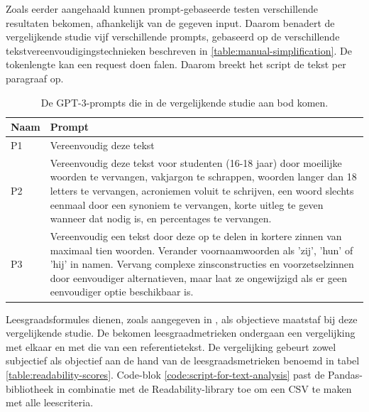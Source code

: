 
\medspace

Zoals eerder aangehaald kunnen prompt-gebaseerde testen verschillende resultaten bekomen, afhankelijk van de gegeven input. Daarom benadert de vergelijkende studie vijf verschillende prompts, gebaseerd op de verschillende tekstvereenvoudigingstechnieken beschreven in \ref{table:manual-simplification}. De tokenlengte kan een request doen falen. Daarom breekt het script de tekst per paragraaf op.

\begin{center}
	\begin{table}[H]
		\begin{tabular}{ | m{2cm} | m{14cm} | } 
			\hline
			\textbf{Naam} & \textbf{Prompt} \\
			\hline
			P1 & Vereenvoudig deze tekst \\
			\hline
			P2 & Vereenvoudig deze tekst voor studenten (16-18 jaar) door moeilijke woorden te vervangen, vakjargon te schrappen, woorden langer dan 18 letters te vervangen, acroniemen voluit te schrijven, een woord slechts eenmaal door een synoniem te vervangen, korte uitleg te geven wanneer dat nodig is, en percentages te vervangen. \\
			\hline
			P3 & Vereenvoudig een tekst door deze op te delen in kortere zinnen van maximaal tien woorden. Verander voornaamwoorden als 'zij', 'hun' of 'hij' in namen. Vervang complexe zinsconstructies en voorzetselzinnen door eenvoudiger alternatieven, maar laat ze ongewijzigd als er geen eenvoudiger optie beschikbaar is. \\
			\hline
		\end{tabular}
		\label{table:tested-prompts}
		\caption{De GPT-3-prompts die in de vergelijkende studie aan bod komen.}
	\end{table}
\end{center}


Leesgraadsformules dienen, zoals aangegeven in \textcite{Nenkova2004}, als objectieve maatstaf bij deze vergelijkende studie. De bekomen leesgraadmetrieken ondergaan een vergelijking met elkaar en met die van een referentietekst. De vergelijking gebeurt zowel subjectief als objectief aan de hand van de leesgraadsmetrieken benoemd in tabel \ref{table:readability-scores}. Code-blok \ref{code:script-for-text-analysis} past de Pandas-bibliotheek in combinatie met de Readability-library toe om een CSV te maken met alle leescriteria.


